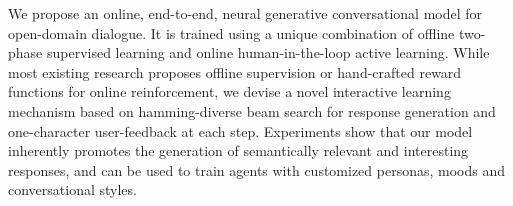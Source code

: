 We propose an online, end-to-end, neural generative conversational model for open-domain dialogue. It is trained using a unique combination of offline two-phase supervised learning and online human-in-the-loop active learning. While most existing research proposes offline supervision or hand-crafted reward functions for online reinforcement, we devise a novel interactive learning mechanism based on hamming-diverse beam search for response generation and one-character user-feedback at each step. Experiments show that our model inherently promotes the generation of semantically relevant and interesting responses, and can be used to train agents with customized personas, moods and conversational styles.
